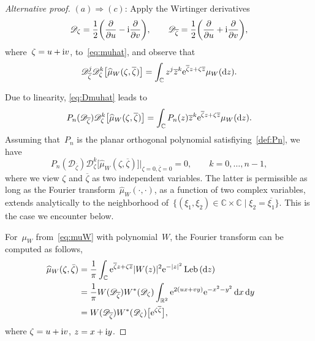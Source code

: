 \documentclass[pdftex]{sigma}
\numberwithin{equation}{section}
\DeclareMathOperator{\Leb}{Leb}
\newcommand*{\Cset}{\mathbb{C}} %
\newcommand*{\Rset}{\mathbb{R}} %
\begin{document}
 \begin{proof}[Alternative proof]
 $(a) \Rightarrow (c)$:
 Apply the Wirtinger derivatives
 \begin{equation*}
 \mathscr{D}_{\zeta} = \frac{1}{2}\bigg(\frac{\partial}{\partial u} - {\rm i} \frac{\partial}{\partial v}\bigg), \qquad
 \mathscr{D}_{\overline{\zeta}} = \frac{1}{2}\bigg(\frac{\partial}{\partial u} + {\rm i} \frac{\partial}{\partial v}\bigg),
 \end{equation*}
 where~$\zeta = u + {\rm i}v$, to~\eqref{eq:muhat}, and observe that
 \begin{equation}
 \label{eq:Dmuhat}
 \mathscr{D}_{\overline{\zeta}}^j \mathscr{D}_{\zeta}^k \big[\widehat{\mu}_W(\zeta, \overline{\zeta})\big] = \int_{\Cset} z^j \overline{z}^k {\rm e}^{\overline{\zeta} z + \zeta \overline{z}} \mu_W({\rm d}z).
 \end{equation}

 Due to linearity, \eqref{eq:Dmuhat} leads to
 \begin{equation*}
 P_n(\mathscr{D}_{\overline{\zeta}}) \mathscr{D}_{\zeta}^k \big[ \widehat{\mu}_W(\zeta, \overline{\zeta}) \big] = \int_{\Cset} P_n(z) \overline{z}^k {\rm e}^{\overline{\zeta} z + \zeta \overline{z}} \mu_W({\rm d}z).
 \end{equation*}
 Assuming that~$P_n$ is the planar orthogonal polynomial satisfiying~\eqref{def:Pn}, we have
 \begin{equation}
 \label{eq:remeq2}
 P_n(\mathscr{D}_{\overline{\zeta}}) \mathscr{D}_{\zeta}^k \big[ \widehat{\mu}_W(\zeta,\overline{\zeta}) \big] \big|_{\zeta=0, \overline{\zeta} = 0}= 0, \qquad k=0,\dots,n-1,
 \end{equation}
 where we view $\zeta$ and $\overline{\zeta}$ as two independent variables. The latter is permissible as long as the Fourier transform~$\widehat{\mu}_W(\cdot,\cdot)$, as a function of two complex variables, extends analytically to the neighborhood of~$\big\{(\xi_1,\xi_2) \in \Cset \times \Cset\mid \xi_2=\overline{\xi_1}\big\}$. This is the case we encounter below.

 For~$\mu_W$ from~\eqref{eq:muW} with polynomial~$W$, the Fourier transform can be computed as follows,
 \begin{align}
 \label{eq:hatmuW}
 \widehat{\mu}_W(\zeta,\bar{\zeta}) &=\frac{1}{\pi} \int_{\Cset} {\rm e}^{ \overline{\zeta} z + \zeta \overline{z}} |W(z)|^2 {\rm e}^{-|z|^2} \Leb{({\rm d}z)}\nonumber
 \\
 &= \frac{1}{\pi} W(\mathscr{D}_{\overline{\zeta}})W^*(\mathscr{D}_\zeta) \int_{\Rset^2} {\rm e}^{2(u x + v y)} {\rm e}^{-x^2 -y^2}\, {\rm d}x\,{\rm d}y \qquad
\nonumber
 \\
 &= W(\mathscr{D}_{\overline{\zeta}})W^*(\mathscr{D}_\zeta) \big[{\rm e}^{\zeta \overline{\zeta}} \big],
 \end{align}
 where $\zeta = u + {\rm i}v$, $z=x+ {\rm i}y$.


\end{proof}
\end{document}
